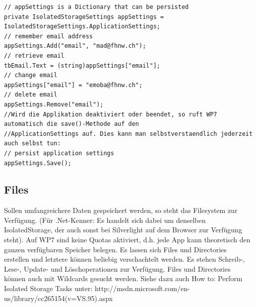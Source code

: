 \documentclass[a4paper,10pt]{scrreprt}
\begin{document}
\begin{lstlisting}[caption=Isolated Storage Settings]
 // appSettings is a Dictionary that can be persisted
private IsolatedStorageSettings appSettings = IsolatedStorageSettings.ApplicationSettings;
// remember email address
appSettings.Add("email", "mad@fhnw.ch");
// retrieve email
tbEmail.Text = (string)appSettings["email"];
// change email
appSettings["email"] = "emoba@fhnw.ch";
// delete email
appSettings.Remove("email");
//Wird die Applikation deaktiviert oder beendet, so ruft WP7 automatisch die save()-Methode auf den
//ApplicationSettings auf. Dies kann man selbstverstaendlich jederzeit auch selbst tun:
// persist application settings
appSettings.Save();
\end{lstlisting}

\subsection{Files}
Sollen umfangreichere Daten gespeichert werden, so steht das Filesystem zur Verfügung. (Für .Net-Kenner: Es
handelt sich dabei um denselben IsolatedStorage, der auch sonst bei Silverlight auf dem Browser zur Verfügung
steht). Auf WP7 sind keine Quotas aktiviert, d.h. jede App kann theoretisch den ganzen verfügbaren Speicher
belegen. Es lassen sich Files und Directories erstellen und letztere können beliebig verschachtelt werden. Es
stehen Schreib-, Lese-, Update- und Löschoperationen zur Verfügung. Files und Directories können auch mit
Wildcards gesucht werden. Siehe dazu auch How to: Perform Isolated Storage Tasks unter:
http://msdn.microsoft.com/en-us/library/cc265154(v=VS.95).aspx
\end{document}
